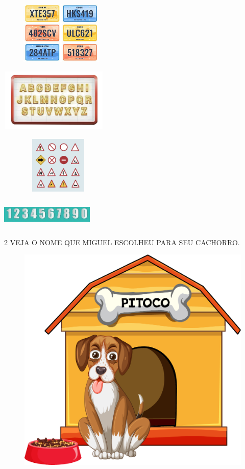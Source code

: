 \begin{escolha}
\item \includegraphics[width=2.32569in,height=1.18472in]{media/image222.jpg}

\item \includegraphics[width=2.03125in,height=1.17361in]{media/image223.png}

\item \includegraphics[width=2.20764in,height=1.07569in]{media/image224.png}

\item \includegraphics[width=1.75000in,height=0.54792in]{media/image225.jpg}
\end{escolha}

\num{2} VEJA O NOME QUE MIGUEL ESCOLHEU PARA SEU CACHORRO. 

\begin{figure}[htpb]
\centering
\includegraphics[width=.5\textwidth]{media/image226.png}
\end{figure}

